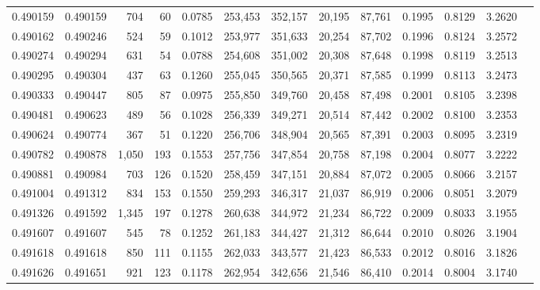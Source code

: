 \begin{tabular}{rrrrrrrrrrrrr}
0.490159 & 0.490159 &   704 &    60 &                                     0.0785 & 253,453 & 352,157 &  20,195 &  87,761 & 0.1995 & 0.8129 & 3.2620 \\
0.490162 & 0.490246 &   524 &    59 &                                     0.1012 & 253,977 & 351,633 &  20,254 &  87,702 & 0.1996 & 0.8124 & 3.2572 \\
0.490274 & 0.490294 &   631 &    54 &                                     0.0788 & 254,608 & 351,002 &  20,308 &  87,648 & 0.1998 & 0.8119 & 3.2513 \\
0.490295 & 0.490304 &   437 &    63 &                                     0.1260 & 255,045 & 350,565 &  20,371 &  87,585 & 0.1999 & 0.8113 & 3.2473 \\
0.490333 & 0.490447 &   805 &    87 &                                     0.0975 & 255,850 & 349,760 &  20,458 &  87,498 & 0.2001 & 0.8105 & 3.2398 \\
0.490481 & 0.490623 &   489 &    56 &                                     0.1028 & 256,339 & 349,271 &  20,514 &  87,442 & 0.2002 & 0.8100 & 3.2353 \\
0.490624 & 0.490774 &   367 &    51 &                                     0.1220 & 256,706 & 348,904 &  20,565 &  87,391 & 0.2003 & 0.8095 & 3.2319 \\
0.490782 & 0.490878 & 1,050 &   193 &                                     0.1553 & 257,756 & 347,854 &  20,758 &  87,198 & 0.2004 & 0.8077 & 3.2222 \\
0.490881 & 0.490984 &   703 &   126 &                                     0.1520 & 258,459 & 347,151 &  20,884 &  87,072 & 0.2005 & 0.8066 & 3.2157 \\
0.491004 & 0.491312 &   834 &   153 &                                     0.1550 & 259,293 & 346,317 &  21,037 &  86,919 & 0.2006 & 0.8051 & 3.2079 \\
0.491326 & 0.491592 & 1,345 &   197 &                                     0.1278 & 260,638 & 344,972 &  21,234 &  86,722 & 0.2009 & 0.8033 & 3.1955 \\
0.491607 & 0.491607 &   545 &    78 &                                     0.1252 & 261,183 & 344,427 &  21,312 &  86,644 & 0.2010 & 0.8026 & 3.1904 \\
0.491618 & 0.491618 &   850 &   111 &                                     0.1155 & 262,033 & 343,577 &  21,423 &  86,533 & 0.2012 & 0.8016 & 3.1826 \\
0.491626 & 0.491651 &   921 &   123 &                                     0.1178 & 262,954 & 342,656 &  21,546 &  86,410 & 0.2014 & 0.8004 & 3.1740 \\

\end{tabular}
